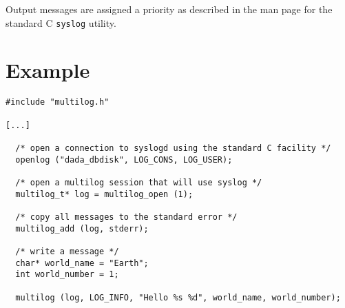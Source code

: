 Output messages are assigned a priority as described in the man page
for the standard C {\tt syslog} utility.

\section{Example}

\begin{verbatim}
#include "multilog.h"

[...]

  /* open a connection to syslogd using the standard C facility */
  openlog ("dada_dbdisk", LOG_CONS, LOG_USER);

  /* open a multilog session that will use syslog */
  multilog_t* log = multilog_open (1);

  /* copy all messages to the standard error */
  multilog_add (log, stderr);

  /* write a message */
  char* world_name = "Earth";
  int world_number = 1;

  multilog (log, LOG_INFO, "Hello %s %d", world_name, world_number);
\end{verbatim}
